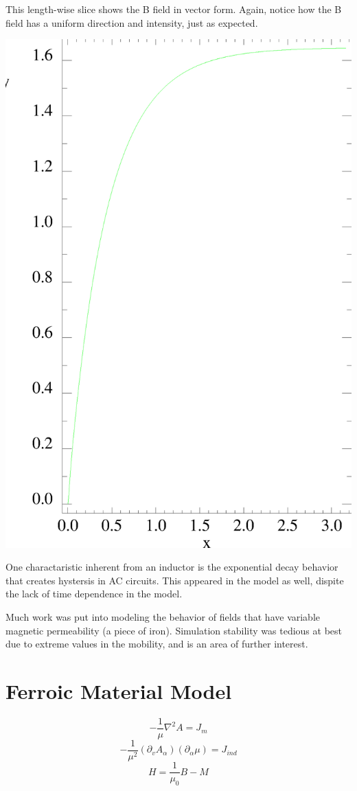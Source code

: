 \documentclass[12pt,a4paper]{article}
\begin{document}
This length-wise slice shows the B field in vector form. Again, notice how the B field has a uniform direction and intensity, just as expected. 

\includegraphics[scale=.7]{Simulations/Energy-Curve.eps} 

One charactaristic inherent from an inductor is the exponential decay behavior that creates hystersis in AC circuits. This appeared in the model as well, dispite the lack of time dependence in the model. 

Much work was put into modeling the behavior of fields that have variable magnetic permeability (a piece of iron). Simulation stability was tedious at best due to extreme values in the mobility, and is an area of further interest.

\section{Ferroic Material Model}

\begin{equation}
-\frac{1}{\mu} \nabla^2 A = J_m 
\end{equation}
\begin{equation}
-\frac{1}{\mu^2} (\partial_v A_\alpha) (\partial_\alpha \mu) = J_{ind}
\end{equation}
\begin{equation}
H = \frac{1}{\mu_0}B - M
\end{equation}
\end{document}
